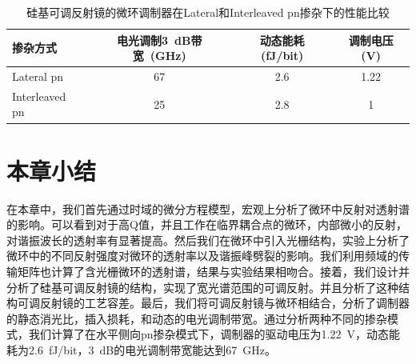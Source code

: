 {
	\begin{table}[htb]
		\caption{硅基可调反射镜的微环调制器在Lateral和Interleaved pn掺杂下的性能比较}
		\label{lateral_interleaved}
		\centering
		\begin{tabular}[t]{p{4cm}ccc}
			\hline
			掺杂方式 &  电光调制3~dB带宽~(GHz) & 动态能耗 (fJ/bit) & 调制电压 (V)\\
			\hline
			Lateral pn & 67 &  2.6 & 1.22 \\
			Interleaved pn & 25 & 2.8 & 1 \\
			\hline
		\end{tabular}
	\end{table}
}

\section{本章小结}
在本章中，我们首先通过时域的微分方程模型，宏观上分析了微环中反射对透射谱的影响。可以看到对于高Q值，并且工作在临界耦合点的微环，内部微小的反射，对谐振波长的透射率有显著提高。然后我们在微环中引入光栅结构，实验上分析了微环中的不同反射强度对微环的透射率以及谐振峰劈裂的影响。我们利用频域的传输矩阵也计算了含光栅微环的透射谱，结果与实验结果相吻合。接着，我们设计并分析了硅基可调反射镜的结构，实现了宽光谱范围的可调反射。并且分析了这种结构可调反射镜的工艺容差。最后，我们将可调反射镜与微环相结合，分析了调制器的静态消光比，插入损耗，和动态的电光调制带宽。通过分析两种不同的掺杂模式，我们计算了在水平侧向pn掺杂模式下，调制器的驱动电压为1.22~V，动态能耗为2.6~fJ/bit，3~dB的电光调制带宽能达到67~GHz。

